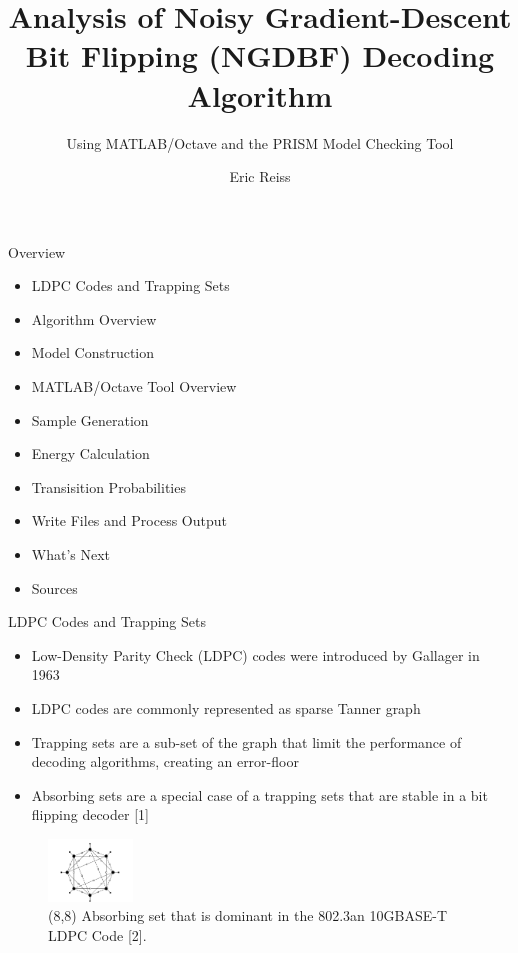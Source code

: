 \documentclass[10pt,ignorenonframetext,]{beamer}
\title{Analysis of Noisy Gradient-Descent Bit Flipping (NGDBF) Decoding
Algorithm}
\subtitle{Using MATLAB/Octave and the PRISM Model Checking Tool}
\author{Eric Reiss}
\date{}
\providecommand{\tightlist}{%
  \setlength{\itemsep}{0pt}\setlength{\parskip}{0pt}}
\begin{document}
\frame{\titlepage}

\begin{frame}{Overview}
\protect\hypertarget{overview}{}
\begin{itemize}[<+->]
\tightlist
\item
  LDPC Codes and Trapping Sets
\item
  Algorithm Overview
\item
  Model Construction
\item
  MATLAB/Octave Tool Overview
\item
  Sample Generation
\item
  Energy Calculation
\item
  Transisition Probabilities
\item
  Write Files and Process Output
\item
  What's Next
\item
  Sources
\end{itemize}
\end{frame}

\begin{frame}{LDPC Codes and Trapping Sets}
\protect\hypertarget{ldpc-codes-and-trapping-sets}{}
\begin{itemize}[<+->]
\tightlist
\item
  Low-Density Parity Check (LDPC) codes were introduced by Gallager in
  1963
\item
  LDPC codes are commonly represented as sparse Tanner graph
\item
  Trapping sets are a sub-set of the graph that limit the performance of
  decoding algorithms, creating an error-floor
\item
  Absorbing sets are a special case of a trapping sets that are stable
  in a bit flipping decoder {[}1{]}
\end{itemize}

\begin{figure}
\centering
\includegraphics[width=0.2\textwidth,height=\textheight]{figures/8_8_absorbing.png}
\caption{(8,8) Absorbing set that is dominant in the 802.3an 10GBASE-T
LDPC Code {[}2{]}.}
\end{figure}
\end{frame}
\end{document}
